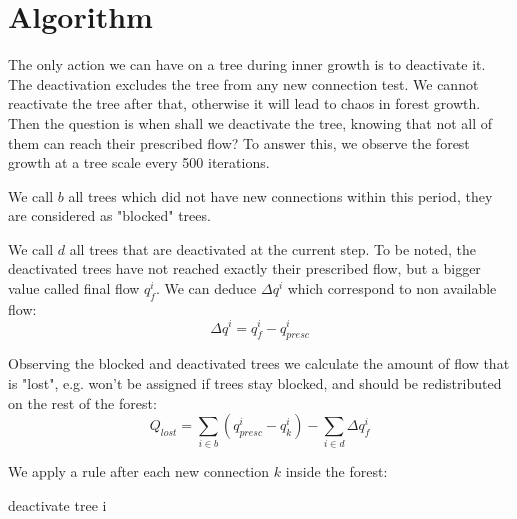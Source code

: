 \documentclass[a4paper, 11pt]{article} %
\begin{document}
\section*{Algorithm}
The only action we can have on a tree during inner growth is to deactivate 
it. The deactivation excludes the tree from any new connection test. We cannot reactivate the tree after that, otherwise it will lead to chaos in forest growth. Then the question is when shall we deactivate the tree, knowing that not all of them can reach their prescribed flow? To answer this, we observe the forest growth at a tree scale every 500 iterations. 

We call $b$ all trees which did not have new connections within this period, they are considered as "blocked" trees. 

We call $d$ all trees that are deactivated at the current step.
To be noted, the deactivated trees have not reached exactly their prescribed flow, but a bigger value called final flow $q_{f}^i$. We can deduce $\Delta q^i$ which correspond to non available flow:
\begin{equation}
\Delta q^i=q_{f}^i - q_{presc}^i 
\end{equation}

Observing the blocked and deactivated trees we calculate the amount of flow that is "lost", e.g. won't be assigned if trees stay blocked, and should be redistributed on the rest of the forest:
\begin{equation}
Q_{lost} = \sum\limits_{i \in b} (q_{presc}^i - q_k^i) - \sum\limits_{i \in d} \Delta q_f^i
\end{equation}

We apply a rule after each new connection $k$ inside the forest:
\begin{algorithm}
\begin{algorithmic} 
\STATE deactivate tree i
\ENDIF
\end{algorithmic} 
\end{algorithm}

\end{document}

